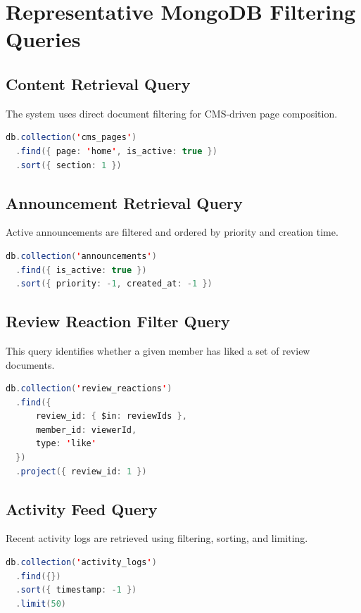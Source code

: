 \documentclass[12pt,a4paper]{report}
\begin{document}
\section{Representative MongoDB Filtering Queries}
\subsection{Content Retrieval Query}
The system uses direct document filtering for CMS-driven page composition.

\begin{lstlisting}[language=Java]
db.collection('cms_pages')
  .find({ page: 'home', is_active: true })
  .sort({ section: 1 })
\end{lstlisting}

\subsection{Announcement Retrieval Query}
Active announcements are filtered and ordered by priority and creation time.

\begin{lstlisting}[language=Java]
db.collection('announcements')
  .find({ is_active: true })
  .sort({ priority: -1, created_at: -1 })
\end{lstlisting}

\subsection{Review Reaction Filter Query}
This query identifies whether a given member has liked a set of review documents.

\begin{lstlisting}[language=Java]
db.collection('review_reactions')
  .find({
      review_id: { $in: reviewIds },
      member_id: viewerId,
      type: 'like'
  })
  .project({ review_id: 1 })
\end{lstlisting}

\subsection{Activity Feed Query}
Recent activity logs are retrieved using filtering, sorting, and limiting.

\begin{lstlisting}[language=Java]
db.collection('activity_logs')
  .find({})
  .sort({ timestamp: -1 })
  .limit(50)
\end{lstlisting}
\end{document}

